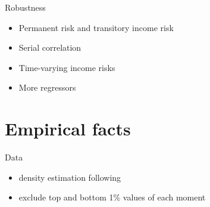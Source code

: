 \documentclass{beamer}
\begin{document}
\begin{frame}{Robustness}
	\begin{itemize}
		\item Permanent risk and transitory income risk 
		\item Serial correlation 
		\item Time-varying income risks 
		\item More regressors 
	\end{itemize}
\end{frame}



\section{Empirical facts}


\begin{frame}{Data}
	\begin{table}
		\centering
		\caption{Survey of Consumer Expectations}
		\label{SCE_data_sum}
	\end{table}
	\begin{itemize}
		\item density estimation following \cite{engelberg_comparing_2009}
		\item exclude top and bottom 1\% values of each moment
	\end{itemize}
\end{frame}
\end{document}
